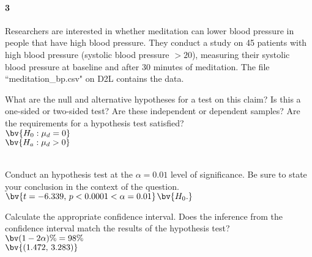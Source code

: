 \documentclass{article}
\begin{document}
\begin{flushleft}
\begin{enumalpha}
\end{enumalpha}

\newpage
\paragraph{3} Researchers are interested in whether meditation can lower blood pressure in people that have high blood pressure. They conduct a study on 45 patients with high blood pressure (systolic blood pressure $> 20$), measuring their systolic blood pressure at baseline and after 30 minutes of meditation. The file ``meditation\_bp.csv" on D2L contains the data.
\begin{enumalpha}
\item What are the null and alternative hypotheses for a test on this claim? Is this a one-sided or two-sided test? Are these independent or dependent samples? Are the requirements for a hypothesis test satisfied?\\
\medskip
$\bv{H_0: \mu_d = 0}$ \\
$\bv{H_a: \mu_d > 0}$ \\
\\
\vspace{1in}

\item Conduct an hypothesis test at the $\alpha = 0.01$ level of significance. Be sure to state your conclusion in the context of the question.\\
\medskip
$\bv{t = -6.339, \, p < 0.0001 < \alpha =0.01}$$\bv{H_0.}$\\
\vspace{1in}
\item Calculate the appropriate confidence interval. Does the inference from the confidence interval match the results of the hypothesis test?\\
\medskip
{}$\bv{(1-2\alpha)\% = 98\%}$\\
$\bv{(1.472, \, 3.283)}$\\

\end{enumalpha}



\end{flushleft}
\end{document}
